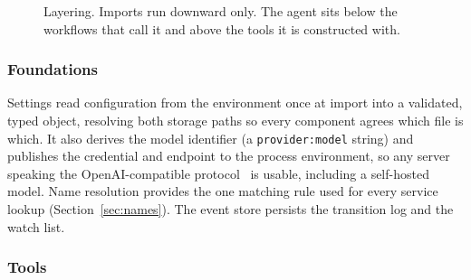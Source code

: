 \documentclass[11pt,a4paper]{article}
\begin{document}
\begin{figure}[H]
\centering
{}
\caption{Layering. Imports run downward only. The agent sits below the workflows that
call it and above the tools it is constructed with.}
\label{fig:layers}
\end{figure}

\subsubsection{Foundations}

Settings read configuration from the environment once at import into a validated,
typed object, resolving both storage paths so every component agrees which file is
which. It also derives the model identifier (a \texttt{provider:model} string) and
publishes the credential and endpoint to the process environment, so any server
speaking the OpenAI-compatible protocol~\cite{openai} is usable, including a
self-hosted model. Name resolution provides the one matching rule used for every
service lookup (Section~\ref{sec:names}). The event store persists the transition
log and the watch list.

\subsubsection{Tools}
\end{document}
